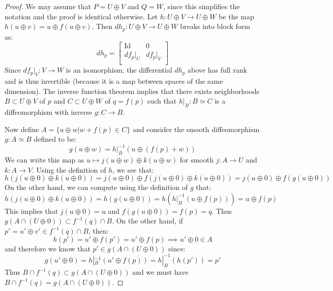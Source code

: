 \documentclass[12pt]{article}
\theoremstyle{definition}
\numberwithin{equation}{section}
\newcommand{\op}{\operatorname}
\begin{document}
\begin{proof} We may assume that $P = U \oplus V$ and $Q = W$, since this simplifies the notation and the proof is identical otherwise. Let $h:U \oplus V \to U \oplus W$ be the map $h(u \oplus v) = u \oplus f(u \oplus v)$. Then $dh_p:U \oplus V \to U \oplus W$ breaks into block form as:
\[
dh_p = \left[
\begin{array}{cc}
\op{Id} & 0\\
df_p|_U & df_p|_V\\
\end{array}
\right]
\]
Since $df_p|_V:V \to W$ is an isomorphism, the differential $dh_p$ above has full rank and is thus invertible (because it is a map between spaces of the same dimension). The inverse function theorem implies that there exists neighborhoods $B \subset U \oplus V$ of $p$ and $C \subset U \oplus W$ of $q = f(p)$ such that $h|_B:B \simeq C$ is a diffeomorphism with inverse $g:C \to B$.

Now define $A = \{u \oplus w| w + f(p) \in C\}$ and consider the smooth diffeomorphism $g:A \simeq B$ defined to be:
\[g(u \oplus w) = h|_B^{-1}(u \oplus (f(p) + w))\]
We can write this map as $u \mapsto j(u \oplus w) \oplus k(u \oplus w)$ for smooth $j:A \to U$ and $k:A \to V$. Using the definition of $h$, we see that:
\[
h(j(u \oplus 0) \oplus k(u \oplus 0)) = j(u \oplus 0) \oplus f(j(u \oplus 0) \oplus k(u \oplus 0)) = j(u \oplus 0) \oplus f(g(u \oplus 0))
\]
On the other hand, we can compute using the definition of $g$ that:
\[ h(j(u \oplus 0) \oplus k(u \oplus 0)) = h(g(u \oplus 0)) = h(h|_B^{-1}(u \oplus f(p))) = u \oplus f(p)
\]
This implies that $j(u \oplus 0) = u$ and $f(g(u \oplus 0)) = f(p) = q$. Thus $g(A \cap (U \oplus 0)) \subset f^{-1}(q) \cap B$. On the other hand, if $p' = u' \oplus v' \in f^{-1}(q) \cap B$, then:
\[
h(p') = u' \oplus f(p') = u' \oplus f(p) \implies u' \oplus 0 \in A
\]
and therefore we know that $p' \in g(A \cap (U \oplus 0))$ since:
\[
g(u' \oplus 0) = h|_B^{-1}(u' \oplus f(p)) = h|_B^{-1}(h(p')) = p'
\]
Thus $B \cap f^{-1}(q) \subset g(A \cap (U \oplus 0))$ and we must have $B \cap f^{-1}(q) = g(A \cap (U \oplus 0))$.\end{proof}
\end{document}
